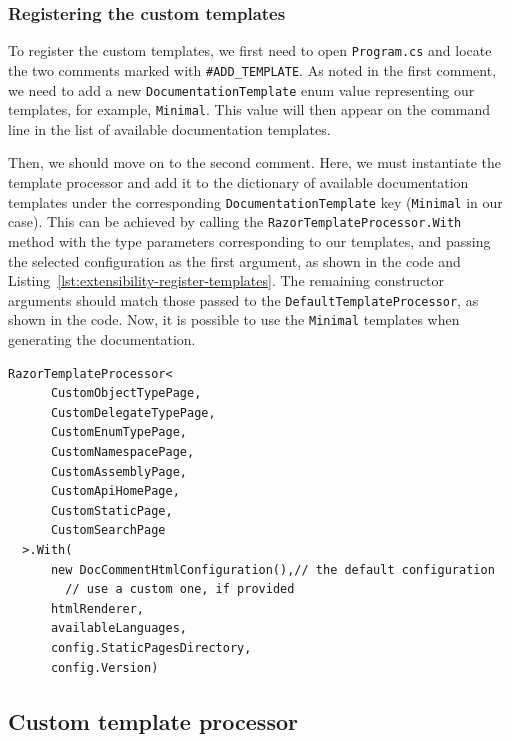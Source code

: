 \subsubsection{Registering the custom templates}
\label{sec:extensibility-register-custom-razor}

To register the custom templates, we first need to open \texttt{Program.cs} and locate the two comments marked with \texttt{\#ADD\_TEMPLATE}.
As noted in the first comment, we need to add a new \texttt{DocumentationTemplate} enum value representing our templates, for example, \texttt{Minimal}.
This value will then appear on the command line in the list of available documentation templates.

Then, we should move on to the second comment.
Here, we must instantiate the template processor
and add it to the dictionary of available documentation templates under the corresponding \texttt{DocumentationTemplate} key (\texttt{Minimal} in our case).
This can be achieved by calling the \texttt{RazorTemplateProcessor.With} method with the type parameters corresponding to our templates, and passing the selected configuration as the first argument, as shown in the code and Listing~\ref{lst:extensibility-register-templates}.
The remaining constructor arguments should match those passed to the \texttt{DefaultTemplateProcessor}, as shown in the code.
Now, it is possible to use the \texttt{Minimal} templates when generating the documentation.

\begin{listing}[H]
\begin{lstlisting}
RazorTemplateProcessor<
      CustomObjectTypePage,
      CustomDelegateTypePage,
      CustomEnumTypePage,
      CustomNamespacePage,
      CustomAssemblyPage,
      CustomApiHomePage,
      CustomStaticPage,
      CustomSearchPage
  >.With(
      new DocCommentHtmlConfiguration(),// the default configuration 
        // use a custom one, if provided
      htmlRenderer,
      availableLanguages,
      config.StaticPagesDirectory,
      config.Version)

\end{lstlisting}
\caption{Using \texttt{RazorTemplateProcessor} with custom templates}
\label{lst:extensibility-register-templates}
\end{listing}

\subsection{Custom template processor}
\label{sec:extensibility-custom-template-processor}

